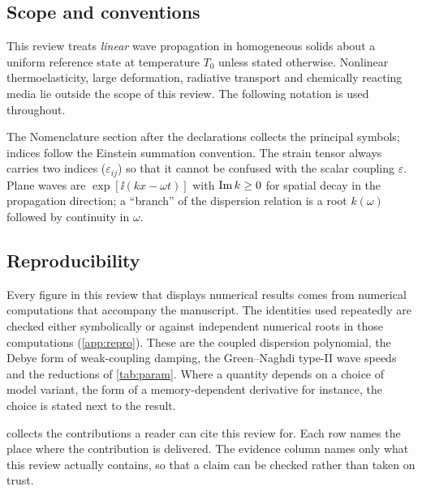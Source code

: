 \subsection{Scope and conventions}\label{sec:conventions}
This review treats \emph{linear} wave propagation in homogeneous solids about a uniform reference state at temperature $T_0$ unless stated otherwise. Nonlinear thermoelasticity, large deformation, radiative transport and chemically reacting media lie outside the scope of this review. The following notation is used throughout.

The Nomenclature section after the declarations collects the principal symbols; indices follow the Einstein summation convention.
The strain tensor always carries two indices ($\varepsilon_{ij}$) so that it cannot be confused with the scalar coupling $\varepsilon$. Plane waves are $\exp[\ii(kx-\omega t)]$ with $\operatorname{Im} k\ge0$ for spatial decay in the propagation direction; a ``branch'' of the dispersion relation is a root $k(\omega)$ followed by continuity in $\omega$.

\subsection{Reproducibility}
Every figure in this review that displays numerical results comes from numerical computations that accompany the manuscript. The identities used repeatedly are checked either symbolically or against independent numerical roots in those computations (\cref{app:repro}). These are the coupled dispersion polynomial, the Debye form of weak-coupling damping, the Green--Naghdi type-II wave speeds and the reductions of \cref{tab:param}. Where a quantity depends on a choice of model variant, the form of a memory-dependent derivative for instance, the choice is stated next to the result.

 collects the contributions a reader can cite this review for. Each row names the place where the contribution is delivered. The evidence column names only what this review actually contains, so that a claim can be checked rather than taken on trust.

